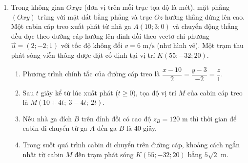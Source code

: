 \documentclass[12pt,a4paper]{article}
\begin{document}
\begin{enumerate}[label=\textbf{Câu \arabic*:}, leftmargin=*]
\item \begin{minipage}[t]{0.55\linewidth}
Trong không gian $Oxyz$ (đơn vị trên mỗi trục tọa độ là mét), mặt phẳng $(Oxy)$ trùng với mặt đất bằng phẳng và trục $Oz$ hướng thẳng đứng lên cao. Một cabin cáp treo xuất phát từ nhà ga $A(10; 3; 0)$ và chuyển động thẳng đều dọc theo đường cáp hướng lên đỉnh đồi theo vectơ chỉ phương $\vec{u} = (2; -2; 1)$ với tốc độ không đổi $v = 6\text{ m/s}$ (như hình vẽ). Một trạm thu phát sóng viễn thông được đặt cố định tại vị trí $K(55; -32; 20)$.
\begin{enumerate}[label=\alph*)]
    \item Phương trình chính tắc của đường cáp treo là $\dfrac{x - 10}{2} = \dfrac{y - 3}{-2} = \dfrac{z}{1}$.
    \item Sau $t$ giây kể từ lúc xuất phát ($t \ge 0$), tọa độ vị trí $M$ của cabin cáp treo là $M(10 + 4t;\ 3 - 4t;\ 2t)$.
    \item Nếu nhà ga đích $B$ trên đỉnh đồi có cao độ $z_B = 120\text{ m}$ thì thời gian để cabin di chuyển từ ga $A$ đến ga $B$ là $40$ giây.
    \item Trong suốt quá trình cabin di chuyển trên đường cáp, khoảng cách ngắn nhất từ cabin $M$ đến trạm phát sóng $K(55; -32; 20)$ bằng $5\sqrt{2}\text{ m}$.
\end{enumerate}
\end{minipage}\hfill
\begin{minipage}[t]{0.42\linewidth}
\vspace{-0.4\baselineskip}
\centering
{}
\end{minipage}
\end{enumerate}
\end{document}
